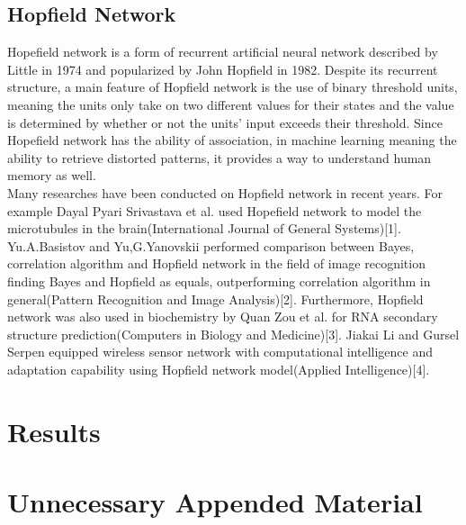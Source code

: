 \documentclass{kththesis}
\begin{document}
\section{Hopfield Network}
Hopefield network is a form of recurrent artificial neural network described by Little in 1974 and popularized by John Hopfield in 1982. Despite its recurrent structure, a main feature of Hopfield network is the use of binary threshold units, meaning the units only take on two different values for their states and the value is determined by whether or not the units' input exceeds their threshold. Since Hopefield network has the ability of association, in machine learning meaning the ability to retrieve distorted patterns, it provides a way to understand human memory as well. \\
Many researches have been conducted on Hopfield network in recent years. For example Dayal Pyari Srivastava et al. used Hopefield network to model the microtubules in the brain(International Journal of General Systems)[1]. Yu.A.Basistov and Yu,G.Yanovskii performed comparison between Bayes, correlation algorithm and Hopfield network in the field of image recognition finding Bayes and Hopfield as equals, outperforming correlation algorithm in general(Pattern Recognition and Image Analysis)[2]. Furthermore, Hopfield network was also used in biochemistry by Quan Zou et al. for RNA secondary structure prediction(Computers in Biology and Medicine)[3]. Jiakai Li and Gursel Serpen equipped wireless sensor network with computational intelligence and adaptation capability using Hopfield network model(Applied Intelligence)[4].
\\
\chapter{Results}

\printbibliography[heading=bibintoc] %

\appendix

\chapter{Unnecessary Appended Material}
\end{document}
